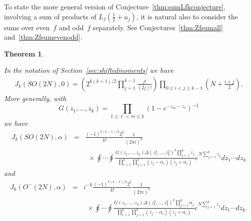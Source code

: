 \documentclass[12pt,letterpaper]{amsart}
\theoremstyle{plain}
\newtheorem{theorem}{Theorem}[section]
\theoremstyle{definition}
\theoremstyle{remark}
\numberwithin{equation}{subsection}
\numberwithin{theorem}{subsection}
\numberwithin{table}{subsection}
\begin{document}
To state the more general version of Conjecture~\ref{thm:sumLfkconjecture}, involving a
sum of products of $L_f(\frac12 + u_j)$, it is natural also to
consider the sums over even~$f$ and odd~$f$ separately. See
Conjectures~\ref{thm:Zfsumall} and~\ref{thm:Zfsumevenodd}.

\begin{theorem} \label{thm:SO2Nk}

 In the notation of Section~\ref{sec:shiftedmoments} we have
\begin{eqnarray}
J_k(SO(2N),0) =\left( 2^{k(k+1)/2} \prod_{j=1}^{k-1} \frac{j!}
{(2j)!} \right) \prod_{0\leq i<j \leq k-1} (N+\tfrac{i+j}{2}). \end{eqnarray}
More generally, with
\begin{equation}
G(z_1,\dots,z_k)= \prod_{1\leq \ell< m \leq
k} (1-e^{-z_{m}-z_{\ell}})^{-1}
\end{equation}
we have
\begin{eqnarray}
J_k(SO(2N),\alpha) & =  &\frac{(-1)^{k(k-1)/2}2^k}{k!}
\frac{1}{(2\pi i)^{k}}
\nonumber \\&   &\ \ \times 
 \oint\cdots \oint
\frac{
G(z_1,\dots,z_k)
\Delta(z_1^2,\ldots,z_{k}^2)^2 \prod_{j=1}^{k} z_j} {
\displaystyle \prod_{i=1}^{k} \prod_{j=1}^{k}
(z_j-\alpha_i)(z_j+\alpha_i)} 
e^{N \sum_{j=1}^k z_j} 
dz_1\cdots dz_{k}   \end{eqnarray}
 and
\begin{eqnarray}
J_k(O^-(2N),\alpha) & =  &i^{-k}\frac{(-1)^{k(k-1)/2}2^k}{k!}
\frac{1}{(2\pi i)^{k}}
\nonumber \\&   &\ \ \times 
 \oint\cdots \oint
\frac{
G(z_1,\dots,z_k)
\Delta(z_1^2,\ldots,z_{k}^2)^2 \prod_{j=1}^{k} \alpha_j} {
\displaystyle \prod_{i=1}^{k} \prod_{j=1}^{k}
(z_j-\alpha_i)(z_j+\alpha_i)} 
e^{N \sum_{j=1}^k z_j} 
dz_1\cdots dz_{k} . 
\end{eqnarray}
\end{theorem}
\end{document}
